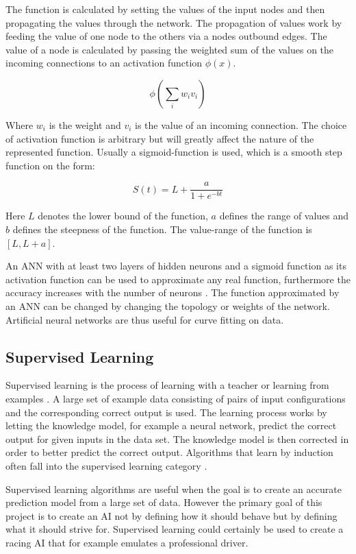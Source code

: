 The function is calculated by setting the values of the input nodes and then propagating the values through the network. The propagation of values work by feeding the value of one node to the others via a nodes outbound edges. The value of a node is calculated by passing the weighted sum of the values on the incoming connections to an activation function $\phi(x)$.

\begin{equation}
    \phi (\sum_i{w_i v_i})
\end{equation}

Where $w_i$ is the weight and $v_i$ is the value of an incoming connection. The choice of activation function is arbitrary but will greatly affect the nature of the represented function. Usually a sigmoid-function is used, which is a smooth step function on the form:

\begin{equation}
    S(t) = L + \frac{a}{1 + e^{-bt}}
\end{equation}

Here $L$ denotes the lower bound of the function, $a$ defines the range of values and $b$ defines the steepness of the function. The value-range of the function is $[L, L+a]$. 

An ANN with at least two layers of hidden neurons and a sigmoid function as its activation function can be used to approximate any real function, furthermore the accuracy increases with the number of neurons \cite{mitchel:approximation}. The function approximated by an ANN can be changed by changing the topology or weights of the network. Artificial neural networks are thus useful for curve fitting on data. 

\subsection{Supervised Learning}
Supervised learning is the process of learning with a teacher or learning from examples \cite{haykin:supervised}. A large set of example data consisting of pairs of input configurations and the corresponding correct output is used. The learning process works by letting the knowledge model, for example a neural network, predict the correct output for given inputs in the data set. The knowledge model is then corrected in order to better predict the correct output. Algorithms that learn by induction often fall into the supervised learning category \cite{glossary}. 

Supervised learning algorithms are useful when the goal is to create an accurate prediction model from a large set of data. However the primary goal of this project is to create an AI not by defining how it should behave but by defining what it should strive for. Supervised learning could certainly be used to create a racing AI that for example emulates a professional driver. 

